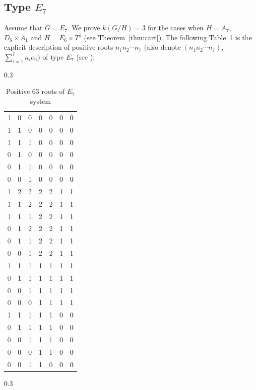 \documentclass{amsart}
\theoremstyle{definition}
\theoremstyle{remark}
\numberwithin{equation}{section}
\begin{document}
\subsection{Type $E_{7}$}
\label{sect:9.2}

Assume that $G=E_{7}$. 
We prove $k(G/H)=3$ for the cases when $H=A_{7}$, $D_{6}\times A_{1}$ and $H=E_{6}\times T^{1}$ (see Theorem~\ref{thm:cart}).
The following Table~\ref{fig:e7} is the explicit description of positive roots $n_{1}n_{2}\cdots n_{7}$ (also denote $(n_{1}n_{2}\cdots n_{7})$, $\sum_{i=1}^{7}n_{i}\alpha_{i}$) of type $E_{7}$ (see \cite[141--144]{Y25}):
\begin{table}[H]
\centering
\caption{Positive $63$ roots of $E_{7}$ system}\label{fig:e7}
\begin{subtable}{0.3\textwidth}
\centering
\begin{tabular}{lllllll}
1 & 0 & 0 & 0 & 0 & 0 & 0 \\
1 & 1 & 0 & 0 & 0 & 0 & 0 \\
1 & 1 & 1 & 0 & 0 & 0 & 0 \\
0 & 1 & 0 & 0 & 0 & 0 & 0 \\
0 & 1 & 1 & 0 & 0 & 0 & 0 \\
0 & 0 & 1 & 0 & 0 & 0 & 0 \\
1 & 2 & 2 & 2 & 2 & 1 & 1 \\
1 & 1 & 2 & 2 & 2 & 1 & 1 \\
1 & 1 & 1 & 2 & 2 & 1 & 1 \\
0 & 1 & 2 & 2 & 2 & 1 & 1 \\
0 & 1 & 1 & 2 & 2 & 1 & 1 \\
0 & 0 & 1 & 2 & 2 & 1 & 1 \\
1 & 1 & 1 & 1 & 1 & 1 & 1 \\
0 & 1 & 1 & 1 & 1 & 1 & 1 \\
0 & 0 & 1 & 1 & 1 & 1 & 1 \\
0 & 0 & 0 & 1 & 1 & 1 & 1 \\
1 & 1 & 1 & 1 & 1 & 0 & 0 \\
0 & 1 & 1 & 1 & 1 & 0 & 0 \\
0 & 0 & 1 & 1 & 1 & 0 & 0 \\
0 & 0 & 0 & 1 & 1 & 0 & 0 \\
0 & 0 & 1 & 1 & 0 & 0 & 0
\end{tabular}
\end{subtable}
\centering
\begin{subtable}{0.3\textwidth}

\end{subtable}
\end{table}
\end{document}
